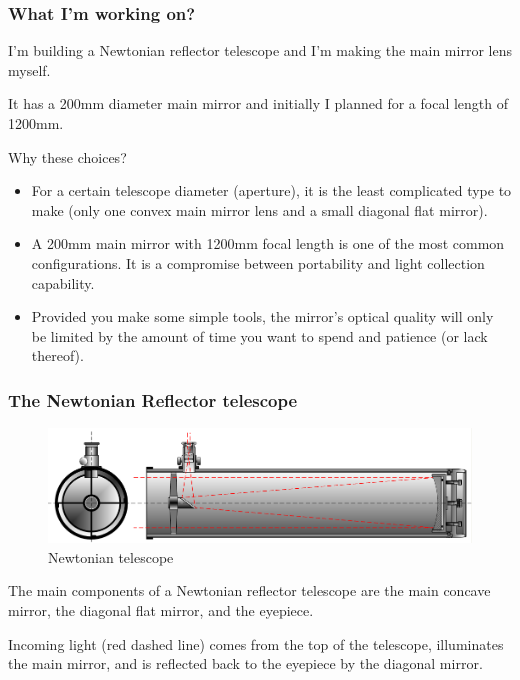 \documentclass{beamer}
\begin{document}
\begin{frame}
\frametitle{What I'm working on?}
I'm building a Newtonian reflector telescope and I'm making the main mirror lens myself.

It has a 200mm diameter main mirror and initially I planned for a focal length of 1200mm.

Why these choices?
\begin{itemize}
\item For a certain telescope diameter (aperture), it is the least complicated type to make (only one convex main mirror lens and a small diagonal flat mirror).
\item A 200mm main mirror with 1200mm focal length is one of the most common configurations. It is a compromise between portability and light collection capability.
\item Provided you make some simple tools, the mirror's optical quality will only be limited by the amount of time you want to spend and patience (or lack thereof).
\end{itemize}
\end{frame}

\begin{frame}
\frametitle{The Newtonian Reflector telescope}
\begin{figure}
\includegraphics[scale=0.4]{assets/Newtontelescope.png}
\caption{Newtonian telescope}
\end{figure}
The main components of a Newtonian reflector telescope are the main concave mirror\footnotemark,
the diagonal flat mirror, and the eyepiece\footnotemark.

Incoming light (red dashed line) comes from the top of the telescope, illuminates the main mirror, and is reflected back to the eyepiece by the diagonal mirror.
\end{frame}
\end{document}
